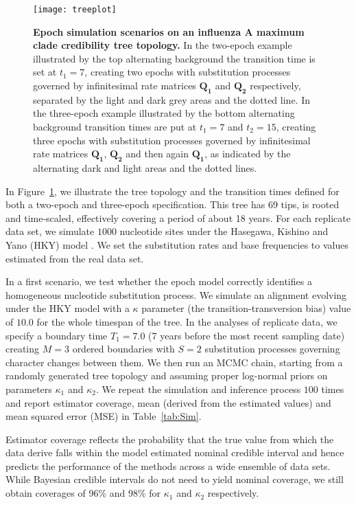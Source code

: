 \begin{figure}[H]
\centering
\texttt{[image: treeplot]} 
\caption{
{ \footnotesize 
{\bf  Epoch simulation scenarios on an influenza A maximum clade credibility tree topology.} 
In the two-epoch example illustrated by the top alternating background
the transition time is set at $t_{1}=7$, creating two epochs with substitution processes governed by infinitesimal rate matrices $\mathbf{Q_{1}}$ and $\mathbf{Q_{2}}$ respectively, separated by the light and dark grey areas and the dotted line.
In the three-epoch example illustrated 
by the bottom alternating background
transition times are put at $t_{1}=7$ and $t_{2}=15$, creating three epochs with substitution processes governed by infinitesimal rate matrices $\mathbf{Q_{1}}$, $\mathbf{Q_{2}}$ and then again $\mathbf{Q_{1}}$, as indicated by the alternating dark and light areas and the dotted lines.
}%
}%
\label{fig:2RateTree}
\end{figure}


In Figure~\ref{fig:2RateTree}, we illustrate the tree topology and the transition times defined for both a two-epoch and three-epoch specification.
This tree has 69 tips, is rooted and time-scaled, effectively covering a period of about 18 years. 
For each replicate data set, we simulate $1000$ nucleotide sites under the Hasegawa, Kishino and Yano (HKY) model \citep{hky85}. 
We set the substitution rates and base frequencies to values estimated from the real data set.

In a first scenario, we test whether the epoch model correctly identifies a homogeneous nucleotide substitution process. 
We simulate an alignment evolving under the HKY model with a $\kappa$ parameter (the transition-transversion bias) value of $10.0$ for the whole timespan of the tree. 
In the analyses of replicate data, we specify a boundary time $T_1=7.0$ (7 years before the most recent sampling date) creating $M=3$ ordered boundaries with $S=2$ substitution processes governing character changes between them.
We then run an MCMC chain, starting from a randomly generated tree topology and assuming proper log-normal priors on parameters $\kappa_{1}$ and $\kappa_{2}$.
We repeat the simulation and inference process $100$ times and report estimator coverage, mean (derived from the estimated values) and mean squared error (MSE) in Table~\ref{tab:Sim}.

Estimator coverage reflects the probability that the true value from which the data derive falls within the model estimated nominal 
credible interval and hence predicts the performance of the methods across a wide ensemble of data sets.
While Bayesian credible intervals do not need to yield nominal coverage, we still obtain coverages of 96\% and 98\% for $\kappa_{1}$ and $\kappa_{2}$ respectively.


